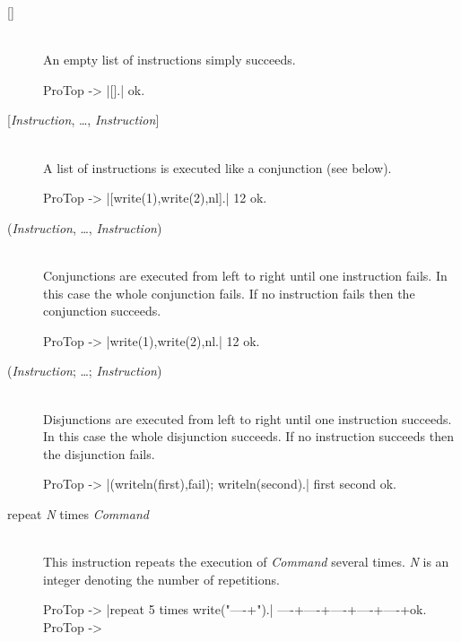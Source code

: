 \begin{description}
  \item [{[]}]\ \\
  An empty list of instructions simply succeeds.
\begin{BoxedSample}
  ProTop -> |[].|
  ok.
\end{BoxedSample}

  \item [{[{\em Instruction}, \ldots, {\em Instruction}]}]\ \\
  A list of instructions is executed like a conjunction (see below).
\begin{BoxedSample}
  ProTop -> |[write(1),write(2),nl].|
  12
  ok.
\end{BoxedSample}

  \item [({\em Instruction}, \ldots, {\em Instruction})]\ \\
  Conjunctions are executed from left to right until one instruction fails.
  In this case the whole conjunction fails. If no instruction fails then
  the conjunction succeeds.
\begin{BoxedSample}
  ProTop -> |write(1),write(2),nl.|
  12
  ok.
\end{BoxedSample}

  \item [({\em Instruction}; \ldots; {\em Instruction})]\ 
    \\
    Disjunctions are executed from left to right until one instruction
    succeeds.  In this case the whole disjunction succeeds. If no instruction
    succeeds then the disjunction fails.
\begin{BoxedSample}
  ProTop -> |(writeln(first),fail); writeln(second).|
  first
  second
  ok.
\end{BoxedSample}

  \item [repeat {\em N}\/ times {\em Command}]\ 
    \\
    This instruction repeats the execution of {\em Command}\/ several times.
    {\em N}\/ is an integer denoting the number of repetitions.
\begin{BoxedSample}
  ProTop -> |repeat 5 times write("----+").|
  ----+----+----+----+----+ok.
  ProTop ->       
\end{BoxedSample}


\end{description}
